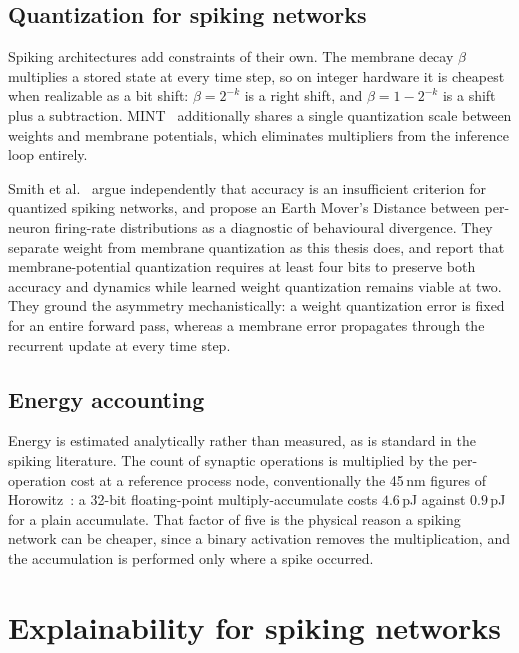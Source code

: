 \subsection{Quantization for spiking networks}

Spiking architectures add constraints of their own. The membrane decay $\beta$
multiplies a stored state at every time step, so on integer hardware it is
cheapest when realizable as a bit shift: $\beta = 2^{-k}$ is a right shift, and
$\beta = 1 - 2^{-k}$ is a shift plus a subtraction. MINT~\cite{yin2024mint}
additionally shares a single quantization scale between weights and membrane
potentials, which eliminates multipliers from the inference loop entirely.

Smith et al.~\cite{smith2026} argue independently that accuracy is an
insufficient criterion for quantized spiking networks, and propose an Earth
Mover's Distance between per-neuron firing-rate distributions as a diagnostic of
behavioural divergence. They separate weight from membrane quantization as this
thesis does, and report that membrane-potential quantization requires at least
four bits to preserve both accuracy and dynamics while learned weight
quantization remains viable at two. They ground the asymmetry mechanistically: a
weight quantization error is fixed for an entire forward pass, whereas a membrane
error propagates through the recurrent update at every time step.

\subsection{Energy accounting}
\label{sec:energy-background}

Energy is estimated analytically rather than measured, as is standard in the
spiking literature. The count of synaptic operations is multiplied by the
per-operation cost at a reference process node, conventionally the 45\,nm
figures of Horowitz~\cite{horowitz2014}: a 32-bit floating-point
multiply-accumulate costs $4.6$\,pJ against $0.9$\,pJ for a plain accumulate.
That factor of five is the physical reason a spiking network can be cheaper,
since a binary activation removes the multiplication, and the accumulation is
performed only where a spike occurred.

\section{Explainability for spiking networks}
\label{sec:sam-background}


